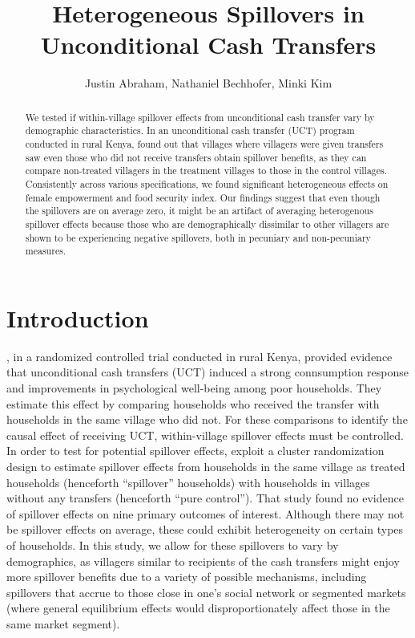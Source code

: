 \documentclass[11pt]{article}
\begin{document}
\title{Heterogeneous Spillovers in Unconditional Cash Transfers}

\author{
	Justin Abraham, Nathaniel Bechhofer, Minki Kim
}

\maketitle

	\begin{abstract}

	 We tested if within-village spillover effects from unconditional cash transfer vary by demographic characteristics. In an unconditional cash transfer (UCT) program conducted in rural Kenya, \textcite{haushofer_short-term_2016} found out that villages where villagers were given transfers saw even those who did not receive transfers obtain spillover benefits, as they can compare non-treated villagers in the treatment villages to those in the control villages. Consistently across various specifications, we found significant heterogeneous effects on female empowerment and food security index. Our findings suggest that even though the spillovers are on average zero, it might be an artifact of averaging heterogenous spillover effects because those who are demographically dissimilar to other villagers are shown to be experiencing negative spillovers, both in pecuniary and non-pecuniary measures.

 	\end{abstract}

\section{Introduction}

    \textcite{haushofer_short-term_2016}, in a randomized controlled trial conducted in rural Kenya, provided evidence that unconditional cash transfers (UCT) induced a strong connsumption response and improvements in psychological well-being among poor households. They estimate this effect by comparing households who received the transfer with households in the same village who did not. For these comparisons to identify the causal effect of receiving UCT, within-village spillover effects must be controlled. 
    In order to test for potential spillover effects, \textcite{haushofer_short-term_2016} exploit a cluster randomization design to estimate spillover effects from households in the same village as treated households (henceforth ``spillover'' households) with households in villages without any transfers (henceforth ``pure control''). That study found no evidence of spillover effects on nine primary outcomes of interest. Although there may not be spillover effects on average, these could exhibit heterogeneity on certain types of households. In this study, we allow for these spillovers to vary by demographics, as villagers similar to recipients of the cash transfers might enjoy more spillover benefits due to a variety of possible mechanisms, including spillovers that accrue to those close in one's social network or segmented markets (where general equilibrium effects would disproportionately affect those in the same market segment). 
\end{document}
